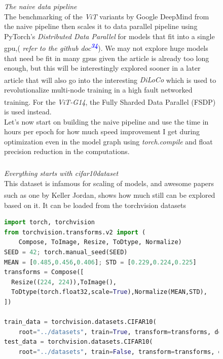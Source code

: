 \documentclass[12pt]{article}
\newcommand{\customtext}[3]{%
    \vspace{#2} %
    \fontsize{13}{8}\textcolor{#1}{\textit{#3}}%
}
\newcommand{\sidecite}[1]{\textsuperscript{\textcolor{blue}{\textbf{\scriptsize#1}}}}
\newcommand{\maincitecount}{\sidecite{\stepcounter{maincite}\themaincite}}
\begin{document}
\begin{figure}[!htb]
    \begin{minipage}[t]{0.65\textwidth}
    \customtext{xtitle}{0em}{The naive data pipeline}\\
    The benchmarking of the {\it ViT} variants by Google DeepMind from the naive pipeline then 
    scales it to data parallel pipeline using PyTorch's {\it Distributed Data Parallel} for models 
    that fit into a single gpu,( {\it \small refer to the github doc\sidecite{34}}). We may not 
    explore huge models that need be fit in many gpus given the article is already too long 
    enough, but this will be interestingly explored sooner in a later article that will also go 
    into the interesting {\it \small DiLoCo\maincitecount} which is used to revolutionalize 
    multi-node training in a high fault networked training\maincitecount. For the {\it ViT-G14}, 
    the Fully Sharded Data Parallel (FSDP) is used instead.\\
    Let's now start on building the naive pipeline and use the time in hours per epoch for how much 
    speed improvement I get during optimization even in the model graph using {\it torch.compile} and 
    float precision reduction in the computations.\\
    \vspace{1em}\\
    \customtext{xtitle}{0em}{Everything starts with cifar10\maincitecount dataset}\\
    This dataset is infamous for scaling of models, and awesome papers such as one 
    by Keller Jordan\maincitecount, shows how much still can be explored based on it.
    It can be loaded from the torchvision datasets
\begin{lstlisting}[language=python,style=python,basicstyle=\ttfamily\scriptsize]
import torch, torchvision 
from torchvision.transforms.v2 import (
    Compose, ToImage, Resize, ToDtype, Normalize)
SEED = 42; torch.manual_seed(SEED)
MEAN = [0.485,0.456,0.406]; STD = [0.229,0.224,0.225]
transforms = Compose([
  Resize((224, 224)),ToImage(),
  ToDtype(torch.float32,scale=True),Normalize(MEAN,STD),
])

train_data = torchvision.datasets.CIFAR10(
    root="../datasets", train=True, transform=transforms, download=True)
test_data = torchvision.datasets.CIFAR10(
    root="../datasets", train=False, transform=transforms, download=True)


\end{lstlisting}
\end{minipage}
\end{figure}
\end{document}
